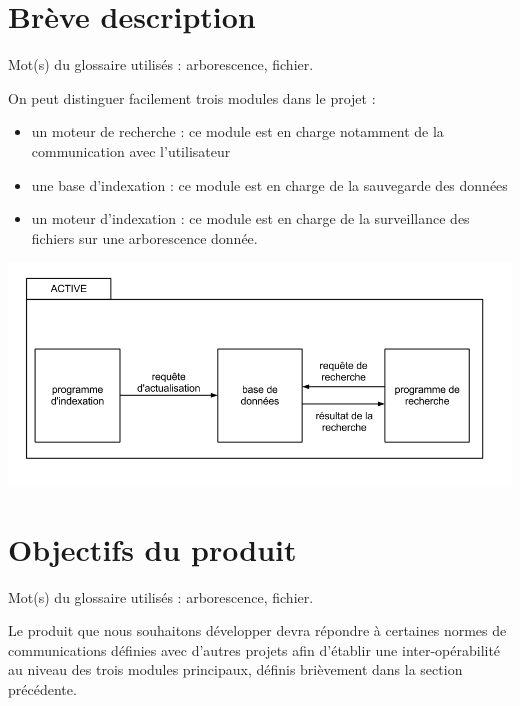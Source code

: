 \documentclass[a4paper,12pt]{report}
\begin{document}
\section{Brève description}
Mot(s) du glossaire utilisés : \gls{arborescence}, \gls{fichier}.

On peut distinguer facilement trois modules dans le projet :
\begin{itemize}
\item un moteur de recherche : ce module est en charge notamment de la communication avec l'utilisateur
\item une base d'indexation : ce module est en charge de la sauvegarde des données
\item un moteur d'indexation : ce module est en charge de la surveillance des fichiers sur une arborescence donnée.
\end{itemize}

\begin{center}
\includegraphics[scale=0.45]{"images/fonctionnement_global_d'active"}
\label{fonctionnement-global}
\end{center}

\section{Objectifs du produit}
Mot(s) du glossaire utilisés : \gls{arborescence}, \gls{fichier}.

Le produit que nous souhaitons développer devra répondre à certaines normes de communications définies avec d'autres projets afin d'établir une inter-opérabilité au niveau des trois modules principaux, définis brièvement dans la section précédente.
\end{document}
